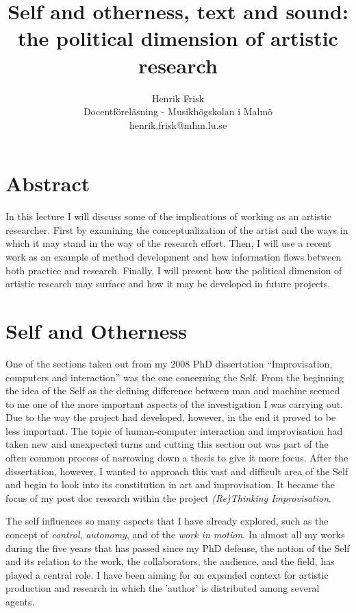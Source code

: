 \documentclass{article}
\begin{document}
\title{Self and otherness, text and sound: the political dimension of artistic research}
\author{Henrik Frisk\\Docentföreläsning - Musikhögskolan i Malmö\\{\small henrik.frisk@mhm.lu.se}}
\date{}

\maketitle

\section*{Abstract}

In this lecture I will discuss some of the implications of working as an artistic researcher. First by examining the conceptualization of the artist and the ways in which it may stand in the way of the research effort. Then, I will use a recent work as an example of method development and how information flows between both practice and research. Finally, I will present how the political dimension of artistic research may surface and how it may be developed in future projects.

\section*{Self and Otherness}

One of the sections taken out from my 2008 PhD dissertation ``Improvisation, computers and interaction'' \cite{frisk08} was the one concerning the Self. From the beginning the idea of the Self as the defining difference between man and machine seemed to me one of the more important aspects of the investigation I was carrying out. Due to the way the project had developed, however, in the end it proved to be less important. The topic of human-computer interaction and improvisation had taken new and unexpected turns and cutting this section out was part of the often common process of narrowing down a thesis to give it more focus. After the dissertation, however, I wanted to approach this vast and difficult area of the Self and begin to look into its constitution in art and improvisation. It became the focus of my post doc research within the project \emph{(Re)Thinking Improvisation}. 

The self influences so many aspects that I have already explored, such as the concept of \emph{control}, \emph{autonomy}, and of the \emph{work in motion}. In almost all my works during the five years that has passed since my PhD defense, the notion of the Self and its relation to the work, the collaborators, the audience, and the field, has played a central role. I have been aiming for an expanded context for artistic production and research in which the 'author' is distributed among several agents.
\end{document}
